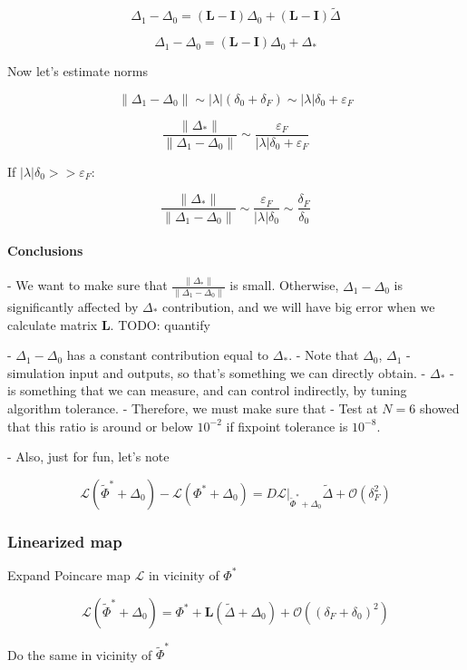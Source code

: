 \documentclass[a4paper,12pt]{article}
\newcommand*{\wt}{\widetilde} %
\newcommand*{\FP}{\Phi^*}%
\newcommand*{\D}{\Delta}%
\begin{document}
\begin{appendices}
$$
\D_1 - \D_0
=  (\mathbf{L} - \mathbf{I})  \D_0  + (\mathbf{L} - \mathbf{I}) \wt \D
$$

$$
\D_1 - \D_0
=  (\mathbf{L} - \mathbf{I})  \D_0  + \D_*
$$

Now let's estimate norms

$$
\lVert \D_1 - \D_0 \rVert
\sim
|\lambda|(\delta_0 + \delta_F)
\sim
|\lambda|\delta_0 + \varepsilon_F
$$

$$
\frac{ \lVert \D_* \rVert }  {\lVert \D_1 - \D_0 \rVert }
\sim
\frac{ \varepsilon_F } { |\lambda| \delta_0 + \varepsilon_F}
$$

If $|\lambda| \delta_0 >>  \varepsilon_{F}:$

$$
\frac{ \lVert \D_* \rVert }  {\lVert \D_1 - \D_0 \rVert }
\sim
\frac{ \varepsilon_F } { |\lambda| \delta_0}
\sim
\frac{ \delta_F } {  \delta_0 }
$$


\paragraph*{Conclusions}
- We want to make sure that $\frac{ \lVert \D_* \rVert }  {\lVert \D_1 - \D_0 \rVert } $ is small. Otherwise, $\D_1 - \D_0$ is significantly affected by $\D_*$ contribution, and we will have big error when we calculate matrix $\mathbf{L}$. TODO: quantify

- $\D_1 - \D_0$ has a constant contribution equal to $\D_*$.
- Note that $\D_0$, $\D_1$ - simulation input and outputs, so that's something we can directly obtain.
- $ \D_* $ - is something that we can measure, and can control indirectly, by tuning
  algorithm tolerance.
- Therefore, we must make sure that
  - Test at $N=6$ showed that this ratio is around or below $10^{-2}$ if fixpoint tolerance is $10^{-8}$.

- Also, just for fun, let's note

$$
 \mathcal{L}(\wt \FP  + \D_0) - \mathcal{L}( \FP  + \D_0) = D\mathcal{L} \vert_{\wt \FP  + \D_0} \wt \D + \mathcal{O}(\delta_F^2)
$$


\subsubsection{Linearized map}
Expand Poincare map $\mathcal{L}$ in vicinity of $\FP$

$$
\mathcal{L}(\wt \FP+ \D_0)
= \FP +  \mathbf{L}  ( \wt \D +  \D_0 ) + \mathcal{O}(( \delta_F + \delta_0)^2)
$$ %

Do the same in vicinity of $\wt \FP$


\end{appendices}
\end{document}
